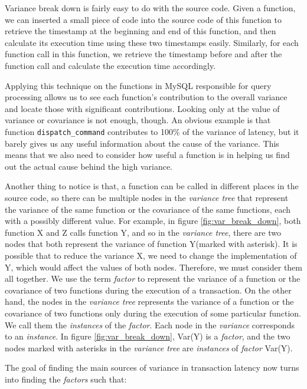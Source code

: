 Variance break down is fairly easy to do with the source code. Given a 
function, we can inserted a small piece of code into the source code of this
function to retrieve the timestamp at the beginning and end of this function,
and then calculate its execution time using these two timestamps easily. 
Similarly, for each function call in this function, we retrieve the timestamp
before and after the function call and calculate the execution time 
accordingly.

Applying this technique on the functions in MySQL responsible for query
processing allows us to see each function's contribution to the overall
variance and locate those with significant contributions. Looking only at the
value of variance or covariance is not enough, though. An obvious example is
that function \texttt{dispatch\_command} contributes to 100\% of the variance
of latency, but it barely gives us any useful information about the cause of
the variance. This means that we also need to consider how useful a function is
in helping us find out the actual cause behind the high variance.

Another thing to notice is that, a function can be called in different places
in the source code, so there can be multiple nodes in the \textit{variance
tree} that represent the variance of the same function or the covariance of the
same functions, each with a possibly different value. For example, in figure
\ref{fig:var_break_down}, both function X and Z calls function Y, and so in the
\textit{variance tree}, there are two nodes that both represent the variance of
function Y(marked with asterisk). It is possible that to reduce the variance X,
we need to change the implementation of Y, which would affect the values of
both nodes. Therefore, we must consider them all together. We use the term
\textit{factor} to represent the variance of a function or the covariance of
two functions during the execution of a transaction. On the other hand, the
nodes in the \textit{variance tree} represents the variance of a function or
the covariance of two functions only during the execution of some particular
function. We call them the \textit{instances} of the \textit{factor}. Each
node in the \textit{variance} corresponds to an \textit{instance}. In figure
\ref{fig:var_break_down}, Var(Y) is a \textit{factor}, and the two nodes marked 
with asterisks in the \textit{variance tree} are \textit{instances} of
\textit{factor} Var(Y).

The goal of finding the main sources of variance in transaction latency
now turns into finding the \textit{factors} such that:

